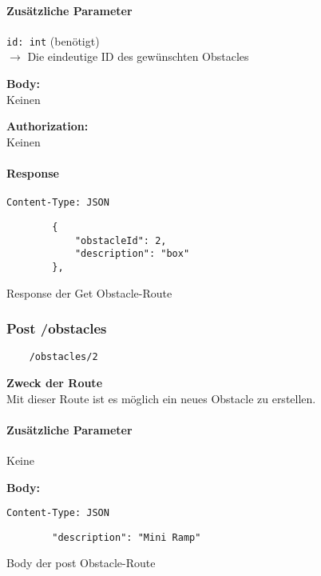 \paragraph{Zusätzliche Parameter}
\lstinline{id: int} (benötigt) \\
$\rightarrow$ Die eindeutige ID des gewünschten Obstacles


\textbf{Body:} \\
Keinen

\textbf{Authorization:} \\
Keinen

\paragraph{Response}
\begin{code}
    \lstinline{Content-Type: JSON}
    \begin{lstlisting}
        {
            "obstacleId": 2,
            "description": "box"
        },
    \end{lstlisting}
    \caption{Response der Get Obstacle-Route}
\end{code}

\pagebreak


\subsubsection{Post /obstacles}

\begin{lstlisting}
    /obstacles/2
\end{lstlisting}

\textbf{Zweck der Route} \\
Mit dieser Route ist es möglich ein neues Obstacle zu erstellen.





\paragraph{Zusätzliche Parameter}
Keine


\textbf{Body:} \\
\begin{code}
    \lstinline{Content-Type: JSON}
    \begin{lstlisting}
        "description": "Mini Ramp"
    \end{lstlisting}
    \caption{Body der post Obstacle-Route}
\end{code}

